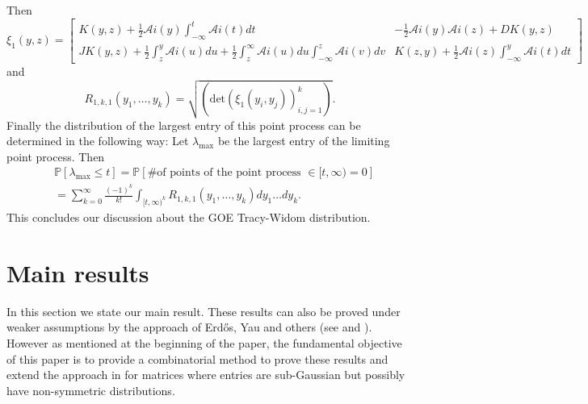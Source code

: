 \documentclass[12pt]{article}
\numberwithin{equation}{section}
\numberwithin{equation}{section}
\theoremstyle{definition}
\renewcommand{\1}{\bf 1}
\begin{document}
Then 
\begin{equation}\label{eq:xi}
\xi_{1}(y,z)= \left[
\begin{array}{ll}
K(y,z) + \frac{1}{2}\mathcal{A}i(y)\int_{-\infty}^{t} \mathcal{A}i(t) dt & -\frac{1}{2} \mathcal{A}i(y)\mathcal{A}i(z) + DK(y,z)\\
JK(y,z) + \frac{1}{2} \int_{z}^{y}\mathcal{A}i(u) du + \frac{1}{2} \int_{z}^{\infty} \mathcal{A}i(u) du \int_{-\infty}^{z}\mathcal{A}i(v)dv & K(z,y) + \frac{1}{2}\mathcal{A}i(z)\int_{-\infty}^{y}\mathcal{A}i(t)dt
\end{array}
\right]
\end{equation} 
and 
\begin{equation}\label{eq:tracywidomcorrelation}
R_{1,k,1}(y_{1},\ldots, y_{k})= \sqrt{ \left(\mathrm{det}\left( \xi_{1}(y_{i},y_{j}) \right)_{i,j=1}^{k}  \right)}.
\end{equation}
Finally the distribution of the largest entry of this point process can be determined in the following way: Let $\lambda_{\max}$ be the largest entry of the limiting point process. Then 
\begin{equation}
\begin{split}
&\mathbb{P}\left[ \lambda_{\max} \le t \right]= \mathbb{P}\left[ \# \text{of points of the point process } \in [t,\infty) = 0 \right]\\
& = \sum_{k=0}^{\infty} \frac{(-1)^{k}}{k!} \int_{[t,\infty)^{k}} R_{1,k,1}(y_{1},\ldots, y_{k}) dy_{1}\ldots dy_{k}.
\end{split}
\end{equation}
This concludes our discussion about the GOE Tracy-Widom distribution.
\section{Main results}
In this section we state our main result. These results can also be proved under weaker assumptions by the approach of Erd\H{o}s, Yau and others (see \cite{erdHos2012rigidity} and \cite{erdHos2012spectral}). However as mentioned at the beginning of the paper, the fundamental objective of this paper is to provide a combinatorial method to prove these results and extend the approach in \citet{sosh} for matrices where entries are sub-Gaussian but possibly have non-symmetric distributions.
\end{document}

